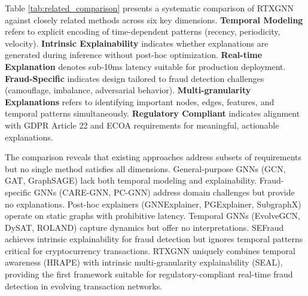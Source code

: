 Table \ref{tab:related_comparison} presents a systematic comparison of RTXGNN against closely related methods across six key dimensions. \textbf{Temporal Modeling} refers to explicit encoding of time-dependent patterns (recency, periodicity, velocity). \textbf{Intrinsic Explainability} indicates whether explanations are generated during inference without post-hoc optimization. \textbf{Real-time Explanation} denotes sub-10ms latency suitable for production deployment. \textbf{Fraud-Specific} indicates design tailored to fraud detection challenges (camouflage, imbalance, adversarial behavior). \textbf{Multi-granularity Explanations} refers to identifying important nodes, edges, features, and temporal patterns simultaneously. \textbf{Regulatory Compliant} indicates alignment with GDPR Article 22 and ECOA requirements for meaningful, actionable explanations.

The comparison reveals that existing approaches address subsets of requirements but no single method satisfies all dimensions. General-purpose GNNs (GCN, GAT, GraphSAGE) lack both temporal modeling and explainability. Fraud-specific GNNs (CARE-GNN, PC-GNN) address domain challenges but provide no explanations. Post-hoc explainers (GNNExplainer, PGExplainer, SubgraphX) operate on static graphs with prohibitive latency. Temporal GNNs (EvolveGCN, DySAT, ROLAND) capture dynamics but offer no interpretations. SEFraud achieves intrinsic explainability for fraud detection but ignores temporal patterns critical for cryptocurrency transactions. RTXGNN uniquely combines temporal awareness (HRAPE) with intrinsic multi-granularity explainability (SEAL), providing the first framework suitable for regulatory-compliant real-time fraud detection in evolving transaction networks.